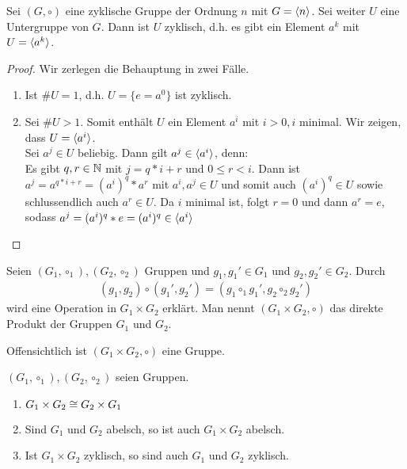 \begin{lemma}
	Sei $(G,\circ)$ eine zyklische Gruppe der Ordnung $n$ mit $G=\langle n \rangle$. Sei weiter $U$ eine Untergruppe von $G$. Dann ist $U$ zyklisch, d.h. es gibt ein Element $a^k$ mit $U=\langle a^k \rangle$.
\end{lemma}
\begin{proof} Wir zerlegen die Behauptung in zwei Fälle.
	\begin{enumerate}
		\item Ist $\# U = 1$, d.h. $U=\{e=a^0\}$ ist zyklisch.
		\item Sei $\# U > 1$. Somit enthält $U$ ein Element $a^i$ mit $i>0, i$ minimal. Wir zeigen, dass $U=\langle a^i \rangle$. \\
		Sei $a^j \in U$ beliebig. Dann gilt $a^j \in \langle a^i \rangle$, denn: \\
		Es gibt $q,r \in \mathbb{N}$ mit $j = q*i + r$ und $0 \leq r < i$. Dann ist $a^j = a^{q*i + r} = (a^i)^q * a^r$ mit $a^i, a^j \in U$ und somit auch $(a^i)^q \in U$ sowie schlussendlich auch $a^r \in U$. Da $i$ minimal ist, folgt $r=0$ und dann $a^r=e$, sodass $a^j = (a^i)^q * e = (a^i)^q \in \langle a^i \rangle$
	\end{enumerate}
\end{proof}

\begin{defin}
	Seien $(G_1,\circ_1), (G_2, \circ_2)$ Gruppen und $g_1, g_1' \in G_1$ und $g_2 , g_2' \in G_2$. Durch 
	\begin{align*}
	(g_1,g_2) \circ (g_1',g_2') = (g_1 \circ_1 g_1' , g_2 \circ_2 g_2')
	\end{align*}
	wird eine Operation in $G_1 \times G_2$ erklärt. Man nennt $(G_1 \times G_2 , \circ)$ das direkte Produkt der Gruppen $G_1$ und $G_2$.
\end{defin}
\begin{bem}
	Offensichtlich ist $(G_1 \times G_2 , \circ)$ eine Gruppe.
\end{bem}
%
\newpage
%
\begin{satz}
	$(G_1, \circ_1), (G_2 , \circ_2)$ seien Gruppen.
	\begin{enumerate}
		\item $G_1 \times G_2 \cong G_2 \times G_1$
		\item Sind $G_1$ und $G_2$ abelsch, so ist auch $G_1 \times G_2$ abelsch.
		\item Ist $G_1 \times G_2$ zyklisch, so sind auch $G_1$ und $G_2$ zyklisch.
	\end{enumerate}
\end{satz}

